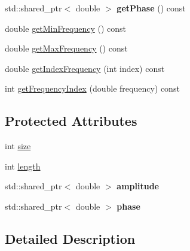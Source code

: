 \begin{DoxyCompactItemize}
\item 
\hypertarget{classspeech_1_1raw__data_1_1FrequencySample_aeaaf886dbb58d227e79ba8c83d5c79a5}{std\+::shared\+\_\+ptr$<$ double $>$ {\bfseries get\+Phase} () const }\label{classspeech_1_1raw__data_1_1FrequencySample_aeaaf886dbb58d227e79ba8c83d5c79a5}

\item 
double \hyperlink{classspeech_1_1raw__data_1_1FrequencySample_a8fb9aae2994358ff72539ab20a381c8d}{get\+Min\+Frequency} () const 
\item 
double \hyperlink{classspeech_1_1raw__data_1_1FrequencySample_a721836c9a8bc54a09d94071de22479ce}{get\+Max\+Frequency} () const 
\item 
double \hyperlink{classspeech_1_1raw__data_1_1FrequencySample_a612d8afe5ae78c696e5f4ef6813d0633}{get\+Index\+Frequency} (int index) const 
\item 
int \hyperlink{classspeech_1_1raw__data_1_1FrequencySample_a35ab1a9cd54987686de97c8806017dd1}{get\+Frequency\+Index} (double frequency) const 
\end{DoxyCompactItemize}
\subsection*{Protected Attributes}
\begin{DoxyCompactItemize}
\item 
int \hyperlink{classspeech_1_1raw__data_1_1FrequencySample_a40ef53bb2ffd8c51a46ada712a8b879d}{size}
\item 
int \hyperlink{classspeech_1_1raw__data_1_1FrequencySample_a1be9745b2f888a25e7c0ace49ce54e71}{length}
\item 
\hypertarget{classspeech_1_1raw__data_1_1FrequencySample_aa3db1e799ea4de48169741615fce4994}{std\+::shared\+\_\+ptr$<$ double $>$ {\bfseries amplitude}}\label{classspeech_1_1raw__data_1_1FrequencySample_aa3db1e799ea4de48169741615fce4994}

\item 
\hypertarget{classspeech_1_1raw__data_1_1FrequencySample_aee6ef4fb46360838b9cdf0c736a9219e}{std\+::shared\+\_\+ptr$<$ double $>$ {\bfseries phase}}\label{classspeech_1_1raw__data_1_1FrequencySample_aee6ef4fb46360838b9cdf0c736a9219e}

\end{DoxyCompactItemize}


\subsection{Detailed Description}
